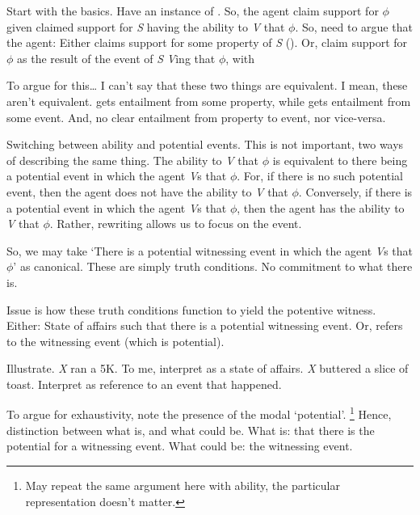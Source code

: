 \begin{note}[Argument]
  \color{red}
  Start with the basics.
  Have an instance of .
  So, the agent claim support for \(\phi\) given claimed support for \emph{S} having the ability to \emph{V} that \(\phi\).
  So, need to argue that the agent:
  Either claims support for some property of \emph{S} (\AR{}).
  Or, claim support for \(\phi\) as the result of the event of \emph{S} \emph{V}ing that \(\phi\), with 
\end{note}

\begin{note}
  {
    \color{red}
    To argue for this\dots
    I can't say that these two things are equivalent.
    I mean, these aren't equivalent.
    \AR{} gets entailment from some property, while \WR{} gets entailment from some event.
    And, no clear entailment from property to event, nor vice-versa.
  }

  Switching between ability and potential events.
  This is not important, two ways of describing the same thing.
  The ability to \emph{V} that \(\phi\) is equivalent to there being a potential event in which the agent \emph{V}s that \(\phi\).
  For, if there is no such potential event, then the agent does not have the ability to \emph{V} that \(\phi\).
  Conversely, if there is a potential event in which the agent \emph{V}s that \(\phi\), then the agent has the ability to \emph{V} that \(\phi\).
  Rather, rewriting allows us to focus on the event.

  So, we may take `There is a potential witnessing event in which the agent \emph{V}s that \(\phi\)' as canonical.
  These are simply truth conditions.
  No commitment to what there is.

  Issue is how these truth conditions function to yield the potentive witness.
  Either:
  State of affairs such that there is a potential witnessing event.
  Or, refers to the witnessing event (which is potential).

  Illustrate.
  \emph{X} ran a 5K.
  To me, interpret as a state of affairs.
  \emph{X} buttered a slice of toast.
  Interpret as reference to an event that happened.

  To argue for exhaustivity, note the presence of the modal `potential'.\nolinebreak
  \footnote{
    May repeat the same argument here with ability, the particular representation doesn't matter.
  }
  Hence, distinction between what is, and what could be.
  What is: that there is the potential for a witnessing event.
  What could be: the witnessing event.


\end{note}
